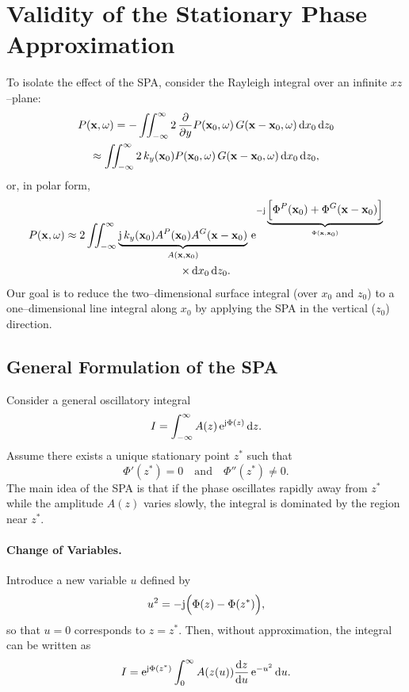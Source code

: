 \documentclass[11pt]{article}
\begin{document}
\section{Validity of the Stationary Phase Approximation}

To isolate the effect of the SPA, consider the Rayleigh integral over an infinite \(xz\)–plane:
\begin{multline}
    P(\mathbf{x},\omega) = -\iint_{-\infty}^{\infty} 2\,\frac{\partial}{\partial y}P(\mathbf{x}_0,\omega)\,G(\mathbf{x}-\mathbf{x}_0,\omega)\,\mathrm{d} x_0\,\mathrm{d} z_0 \\
    \approx \iint_{-\infty}^{\infty} 2\,k_y(\mathbf{x}_0)P(\mathbf{x}_0,\omega)\,G(\mathbf{x}-\mathbf{x}_0,\omega)\,\mathrm{d} x_0\,\mathrm{d} z_0,
    \label{eq:Rayleigh}
\end{multline}
or, in polar form,
\begin{multline}
    P(\mathbf{x},\omega) \approx 2\iint_{-\infty}^{\infty} \underbrace{\mathrm{j}\,k_y(\mathbf{x}_0)A^P(\mathbf{x}_0)A^G(\mathbf{x}-\mathbf{x}_0)}_{A(\mathbf{x},\mathbf{x}_0)} \, \mathrm{e}^{-\mathrm{j}\underbrace{\Bigl[\Phi^P(\mathbf{x}_0)+\Phi^G(\mathbf{x}-\mathbf{x}_0)\Bigr]}_{\Phi(\mathbf{x},\mathbf{x}_0)}} \\
    \times\,\mathrm{d} x_0\,\mathrm{d} z_0.
    \label{eq:RayleighPolar}
\end{multline}
Our goal is to reduce the two–dimensional surface integral (over \(x_0\) and \(z_0\)) to a one–dimensional line integral along \(x_0\) by applying the SPA in the vertical (\(z_0\)) direction.

\subsection{General Formulation of the SPA}

Consider a general oscillatory integral
\begin{equation}
    I = \int_{-\infty}^{\infty} A(z)\,\mathrm{e}^{\mathrm{j}\Phi(z)}\,\mathrm{d} z.
\end{equation}
Assume there exists a unique stationary point \(z^*\) such that
\begin{equation}
    \Phi'(z^*)=0 \quad \text{and} \quad \Phi''(z^*)\neq0.
\end{equation}
The main idea of the SPA is that if the phase oscillates rapidly away from \(z^*\) while the amplitude \(A(z)\) varies slowly, the integral is dominated by the region near \(z^*\).

\paragraph{Change of Variables.}  
Introduce a new variable \(u\) defined by
\begin{equation}
    u^2 = -\mathrm{j}\Bigl(\Phi(z)-\Phi(z^*)\Bigr),
    \label{eq:u_def}
\end{equation}
so that \(u=0\) corresponds to \(z=z^*\). Then, without approximation, the integral can be written as
\begin{equation}
    I = \mathrm{e}^{\mathrm{j}\Phi(z^*)}\int_{0}^{\infty} A(z(u))\frac{\mathrm{d} z}{\mathrm{d} u}\,\mathrm{e}^{-u^2}\,\mathrm{d} u.
\end{equation}
\end{document}
